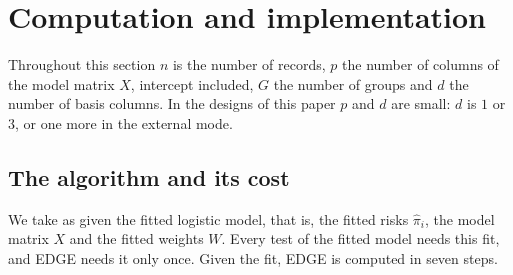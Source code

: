 \section{Computation and implementation}\label{sec:computation}

Throughout this section $n$ is the number of records, $p$ the number of columns of the model matrix
$X$, intercept included, $G$ the number of groups and $d$ the number of basis columns. In the designs of
this paper $p$ and $d$ are small: $d$ is $1$ or $3$, or one more in the external mode.

\subsection{The algorithm and its cost}\label{sec:algorithm}

We take as given the fitted logistic model, that is, the fitted risks $\hat\pi_i$, the model
matrix $X$ and the fitted weights $W$. Every test of the fitted model needs this fit, and EDGE needs it
only once. Given the fit, EDGE is computed in seven steps.

